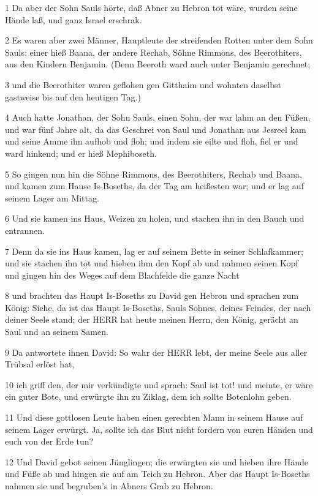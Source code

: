 \par 1 Da aber der Sohn Sauls hörte, daß Abner zu Hebron tot wäre, wurden seine Hände laß, und ganz Israel erschrak.
\par 2 Es waren aber zwei Männer, Hauptleute der streifenden Rotten unter dem Sohn Sauls; einer hieß Baana, der andere Rechab, Söhne Rimmons, des Beerothiters, aus den Kindern Benjamin. (Denn Beeroth ward auch unter Benjamin gerechnet;
\par 3 und die Beerothiter waren geflohen gen Gitthaim und wohnten daselbst gastweise bis auf den heutigen Tag.)
\par 4 Auch hatte Jonathan, der Sohn Sauls, einen Sohn, der war lahm an den Füßen, und war fünf Jahre alt, da das Geschrei von Saul und Jonathan aus Jesreel kam und seine Amme ihn aufhob und floh; und indem sie eilte und floh, fiel er und ward hinkend; und er hieß Mephiboseth.
\par 5 So gingen nun hin die Söhne Rimmons, des Beerothiters, Rechab und Baana, und kamen zum Hause Is-Boseths, da der Tag am heißesten war; und er lag auf seinem Lager am Mittag.
\par 6 Und sie kamen ins Haus, Weizen zu holen, und stachen ihn in den Bauch und entrannen.
\par 7 Denn da sie ins Haus kamen, lag er auf seinem Bette in seiner Schlafkammer; und sie stachen ihn tot und hieben ihm den Kopf ab und nahmen seinen Kopf und gingen hin des Weges auf dem Blachfelde die ganze Nacht
\par 8 und brachten das Haupt Is-Boseths zu David gen Hebron und sprachen zum König: Siehe, da ist das Haupt Is-Boseths, Sauls Sohnes, deines Feindes, der nach deiner Seele stand; der HERR hat heute meinen Herrn, den König, gerächt an Saul und an seinem Samen.
\par 9 Da antwortete ihnen David: So wahr der HERR lebt, der meine Seele aus aller Trübsal erlöst hat,
\par 10 ich griff den, der mir verkündigte und sprach: Saul ist tot! und meinte, er wäre ein guter Bote, und erwürgte ihn zu Ziklag, dem ich sollte Botenlohn geben.
\par 11 Und diese gottlosen Leute haben einen gerechten Mann in seinem Hause auf seinem Lager erwürgt. Ja, sollte ich das Blut nicht fordern von euren Händen und euch von der Erde tun?
\par 12 Und David gebot seinen Jünglingen; die erwürgten sie und hieben ihre Hände und Füße ab und hingen sie auf am Teich zu Hebron. Aber das Haupt Is-Boseths nahmen sie und begruben's in Abners Grab zu Hebron.

